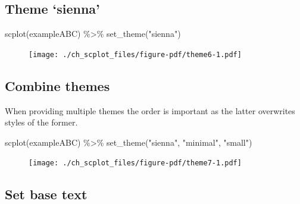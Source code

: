 \documentclass[
  letterpaper,
  DIV=11,
  numbers=noendperiod]{scrreprt}
\newenvironment{Shaded}{\begin{snugshade}}{\end{snugshade}}
\newcommand{\FunctionTok}[1]{\textcolor[rgb]{0.28,0.35,0.67}{#1}}
\newcommand{\NormalTok}[1]{\textcolor[rgb]{0.00,0.23,0.31}{#1}}
\newcommand{\SpecialCharTok}[1]{\textcolor[rgb]{0.37,0.37,0.37}{#1}}
\newcommand{\StringTok}[1]{\textcolor[rgb]{0.13,0.47,0.30}{#1}}
\begin{document}
\hypertarget{theme-sienna}{%
\subsection{Theme `sienna'}\label{theme-sienna}}

\begin{Shaded}
\begin{Highlighting}[]
\FunctionTok{scplot}\NormalTok{(exampleABC) }\SpecialCharTok{\%\textgreater{}\%}
  \FunctionTok{set\_theme}\NormalTok{(}\StringTok{"sienna"}\NormalTok{)}
\end{Highlighting}
\end{Shaded}

\begin{figure}[H]

{\centering \texttt{[image: ./ch\_scplot\_files/figure-pdf/theme6-1.pdf]}

}

\end{figure}

\hypertarget{combine-themes}{%
\subsection{Combine themes}\label{combine-themes}}

When providing multiple themes the order is important as the latter
overwrites styles of the former.

\begin{Shaded}
\begin{Highlighting}[]
\FunctionTok{scplot}\NormalTok{(exampleABC) }\SpecialCharTok{\%\textgreater{}\%}
  \FunctionTok{set\_theme}\NormalTok{(}\StringTok{"sienna"}\NormalTok{, }\StringTok{"minimal"}\NormalTok{, }\StringTok{"small"}\NormalTok{)}
\end{Highlighting}
\end{Shaded}

\begin{figure}[H]

{\centering \texttt{[image: ./ch\_scplot\_files/figure-pdf/theme7-1.pdf]}

}

\end{figure}

\hypertarget{set-base-text}{%
\subsection{Set base text}\label{set-base-text}}
\end{document}
